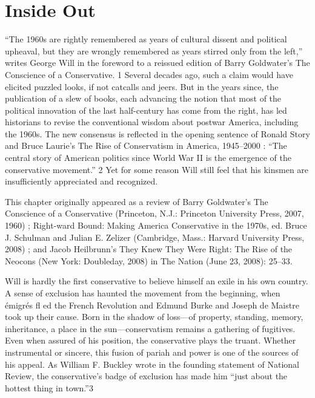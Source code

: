 \chapter{Inside Out}\label{Inside Out}
 \par 
“The 1960s are rightly remembered as years of cultural dissent and political upheaval, but they are wrongly remembered as years stirred only from the left,” writes George Will in the foreword to a reissued edition of Barry Goldwater’s The Conscience of a Conservative. {\color{blue}1} Several decades ago, such a claim would have elicited puzzled looks, if not catcalls and jeers. But in the years since, the publication of a slew of books, each advancing the notion that most of the political innovation of the last half-century has come from the right, has led historians to revise the conventional wisdom about postwar America, including the 1960s. The new consensus is reflected in the opening sentence of Ronald Story and Bruce Laurie’s The Rise of Conservatism in America, 1945–2000 : “The central story of American politics since World War II is the emergence of the conservative movement.” {\color{blue}2} Yet for some reason Will still feel that his kinsmen are insufficiently appreciated and recognized.
 \par 
This chapter originally appeared as a review of Barry Goldwater’s The Conscience of a Conservative (Princeton, N.J.: Princeton University Press, 2007, 1960) ; Right-ward Bound: Making America Conservative in the 1970s, ed. Bruce J. Schulman and Julian E. Zelizer (Cambridge, Mass.: Harvard University Press, 2008) ; and Jacob Heilbrunn’s They Knew They Were Right: The Rise of the Neocons (New York: Doubleday, 2008) in The Nation (June 23, 2008): 25–33.
 \par 
Will is hardly the first conservative to believe himself an exile in his own country. A sense of exclusion has haunted the movement from the beginning, when émigrés fl ed the French Revolution and Edmund Burke and Joseph de Maistre took up their cause. Born in the shadow of loss—of property, standing, memory, inheritance, a place in the sun—conservatism remains a gathering of fugitives. Even when assured of his position, the conservative plays the truant. Whether instrumental or sincere, this fusion of pariah and power is one of the sources of his appeal. As William F. Buckley wrote in the founding statement of National Review, the conservative’s badge of exclusion has made him “just about the hottest thing in town.”{\color{blue}3}
 \par 
